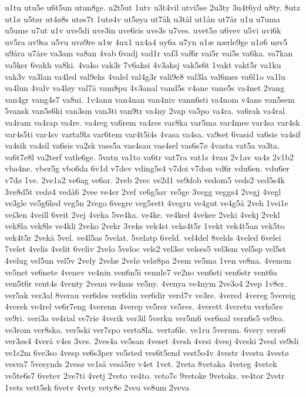 {u1tu
utu5e
u6t5un
utun8ge.
u2t5ut
1utv
u3t4vil
utvi5se
2u3ty
3u4t6yd
u8ty.
8utz
ut1ø
u5tør
ut4ø8s
utøs7t
1utø4v
ut5øya
ut7åk
u3tål
ut1ån
ut7år
u1u
u7uma
u5ume
u7ut
u1v
uve5di
uve3in
uve6ris
uve3s
u7ves.
uvet5ø
u6vev
u5vi
uvi6k
uv5ra
uv9sa
u5vu
uvø9re
u1w
4ux1
ux4a4
uy6a
u7yn
u1æ
uærle9ge
u1ø6
uøv5
u9åra
u7åre
va3am
va8an
4vab
6vadj
vad1r
vaf3
vaf6r
vai5r
vai5s
va6ka.
va7kan
va5ker
6vakh
va8ki.
4vako
vak3r
7v6aksi
4v3aksj
vak5s6t
1vakt
vakt5r
va1ku
vak3v
va3lan
va4led
val9eks
4valel
val4g3r
vali9e8
val3la
val6mes
va6l1o
va1lu
va4lun
4valv
va4løy
val7å
vam8pu
4v3anal
vand5s
v4ane
vane5s
va4net
2vang
van4gr
vang4s7
va8ni.
1v4ann
van4nan
van4niv
vann6sti
va4nom
v4ans
van5sem
5vansk
van5s6ki
van3sm
van3ti
van9tr
va4ny
2vap
va5po
va4ra.
va6rak
va4ral
va4ram
va4rap
va4re.
va4reg
va6rem
va4res
var8ka
var5ma
var4mee
var4sa
var4sk
var4s5ti
var4sv
varta9la
var6tem
var4t5i4s
4vasa
va4sa.
va9set
6vasid
va6sie
va4sif
va4sik
va4sil
va6sis
va2sk
vass5a
vas4sau
vas4sel
vas6s7ø
4vasta
vat5a
va3ta.
va6t7e8l
va2terf
vatle6ge.
5vatn
va1to
va6tr
vat7ra
vat1s
4vau
2v1av
va4z
2v1b2
vba4ne.
vber5g
vbo6da
6v1d
v7dev
vding5s4
v7doi
v7don
vd6r
vdu6en.
vdu6er
v7dø
1ve.
2ve1a2
ve6ag
ve6ar.
2veb
2vec
ve2d1
ve9dob
vedom5
veds2
ved5s4k
3ve8d5t
vedø4
vedå6
2vee
ve4er
2vef
ve6g5av
ve5ge
3vegg
veggs4
2vegj
4vegl
ve3gle
ve5g6lød
veg5n
2vego
6vegre
veg5rett
4vegru
ve4gut
ve4g5å
2veh
1vei1e
vei3en
4veill
6veit
2vej
4veka
5ve4ka.
ve4ke.
ve4ked
4vekee
2veki
4vekj
2vekl
vek8la
vek8le
ve4kli
2veko
2vekr
3veks
vek4st
veks4t5r
1vekt
vek4t5an
vek5to
vek4t5r
2vekå
5vel.
ve4l5as
5velat.
5velatp
6veld.
vel4del
8velds
4veled
6velei
7velet
4velis
4velit
6veliv
2velo
5veloc
vels2
vel3se
velses5
vel3sm
vel5sp
vel5st
4velug
vel5un
vel5v
2vely
2velæ
2velø
velø8pa
2vem
ve5ma
1ven
ve8na.
4venem
ve5net
ve6nete
4venev
ve4nin
ven6n5i
vennle7
ve2no
ven6sti
ven6str
vent6a
ven5t6r
vent4s
4venty
2venu
ve4nus
ve5ny.
4venya
ve4nym
2ve3o4
2vep
1v8er.
ver5ak
ver3al
8verau
ver6des
ver6din
ver6dir
verd7v
ve3re.
4vered
4vereg
5vereig
4verek
ve4rel
ve6r7eng
4verenn
4verep
ve5rer
ve5res.
4verett
4veretu
verfø5re
ve9ri.
veri3a
ve4rial
ve7rie
4verik
ver3il
5verkn
ver5m6
ver6nal
vern6s5
ve9ro.
ve3rom
ver8ska.
ver5ski
ver7spo
verta8la.
verta6le.
ve1ru
5verum.
6very
verø6
ver3øs4
4verå
v4es
3ves.
2ves4a
ve5san
4veset
4vesh
4vesi
4vesj
4veski
2vesl
ve9sli
ve1s2m
6ve3so
4vesp
ve6s3per
ve5sted
ves6t5end
vest5o4v
4vestr
4vestu
4vestø
vesva7
5vesynds
2vesø
ve1så
veså5re
v4et
1vet.
2veta
8vetaka
4veteg
4vetek
ve5te6s7
6vetev
2ve7ti
4vetj
2veto
ve4to.
veto7e
9vetoke
9vetoks.
ve4tor
2vetr
1vets
vett5sk
6vetv
4vety
vety8e
2veu
ve8um
2veva
}
